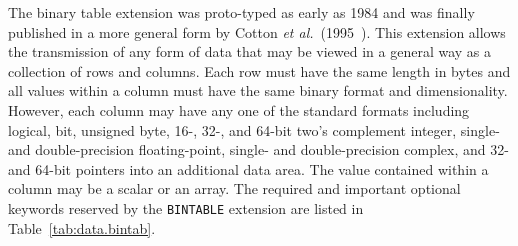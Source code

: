 \documentclass[twoside]{article}
\newcommand{\etal}{{\it et al.}}
\newcommand{\keyw}[1]{\hbox{{\tt #1}}}
\begin{document}
The binary table extension was proto-typed as early as 1984 and was
finally published in a more general form by Cotton
\etal~(1995~\cite{CTP95}).  This extension allows the transmission of
any form of data that may be viewed in a general way as a collection
of rows and columns.  Each row must have the same length in bytes and
all values within a column must have the same binary format and
dimensionality.  However, each column may have any one of the standard
formats including logical, bit, unsigned byte, \hbox{16-,} \hbox{32-,}
and 64-bit two's complement integer, single- and double-precision
floating-point, single- and double-precision complex, and 32- and
64-bit pointers into an additional data area.  The value contained
within a column may be a scalar or an array.  The required and
important optional keywords reserved by the \keyw{BINTABLE} extension
are listed in Table~\ref{tab:data.bintab}.
\end{document}
